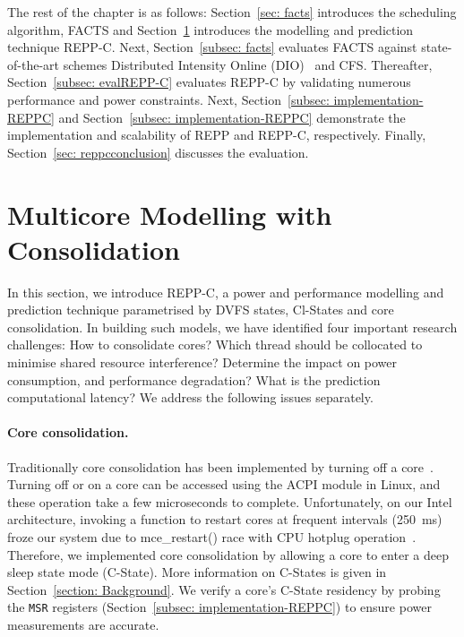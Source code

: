  The rest of the chapter is as follows: Section~\ref{sec: facts} introduces
the scheduling algorithm, FACTS and Section~\ref{sec: repp-c} introduces the modelling and
prediction technique REPP-C. Next, Section~\ref{subsec: facts} evaluates FACTS against
state-of-the-art schemes Distributed Intensity Online
(DIO)~\citep{Blagodurov:2010:CSM:1880018.1880019} and CFS.  Thereafter,
Section~\ref{subsec: evalREPP-C} evaluates REPP-C by validating numerous performance and
power constraints. Next, Section~\ref{subsec: implementation-REPPC} and
Section~\ref{subsec: implementation-REPPC} demonstrate the implementation and scalability of REPP
and REPP-C, respectively. Finally, Section~\ref{sec: reppcconclusion} discusses the
evaluation.




\section{Multicore Modelling with Consolidation} 
\label{sec: repp-c}

 In this section, we introduce REPP-C, a power and performance modelling and
prediction technique parametrised by DVFS states, Cl-States and core consolidation.  In
building such models, we have identified four important research challenges: {\small
{}} How to consolidate cores? {\small {}} Which thread should be
collocated to minimise shared resource interference? {\small {}} Determine the impact on power
consumption, and performance degradation?  {\small {}} What is the prediction
computational latency? We address the following issues separately.  

\paragraph{Core consolidation.} Traditionally core consolidation has been implemented by
turning off a core~\citep{sysfstool}. Turning off or on a core can be accessed using the
ACPI module in Linux, and these operation take a few microseconds to complete.
Unfortunately, on our Intel architecture, invoking a function to restart cores at frequent
intervals (\SI{250}{\milli\second}) froze our system due to \textsf{mce\_restart()} race with CPU hotplug
operation~\citep{lkmlerror}. Therefore, we implemented core consolidation by allowing a
core to enter a deep sleep state mode (C-State). More information on C-States is given in
Section~\ref{section: Background}.  We verify a core's C-State residency by probing the
\texttt{MSR} registers (Section~\ref{subsec: implementation-REPPC}) to ensure power
measurements are accurate.


